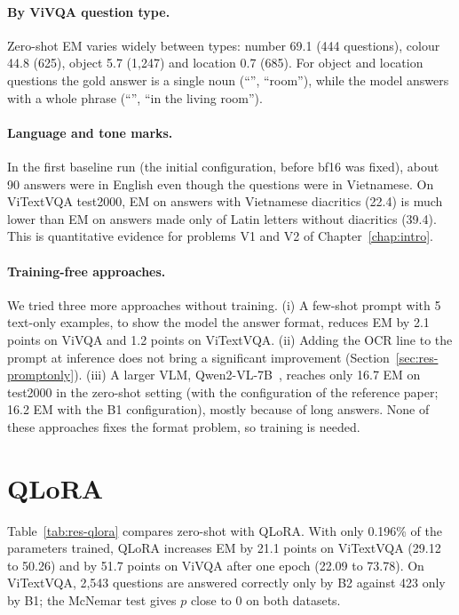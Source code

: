 \paragraph{By ViVQA question type.} Zero-shot EM varies widely between types: number 69.1
(444 questions), colour 44.8 (625), object 5.7 (1,247) and location 0.7 (685). For object
and location questions the gold answer is a single noun (``'', ``room''), while
the model answers with a whole phrase (``'', ``in the living
room'').

\paragraph{Language and tone marks.} In the first baseline run (the initial configuration,
before bf16 was fixed), about 90 answers were in English even though the questions were in
Vietnamese. On ViTextVQA test2000, EM on answers with Vietnamese diacritics (22.4) is much
lower than EM on answers made only of Latin letters without diacritics (39.4). This is
quantitative evidence for problems V1 and V2 of Chapter~\ref{chap:intro}.

\paragraph{Training-free approaches.} We tried three more approaches without
training. (i) A few-shot prompt with 5 text-only examples, to show the model the answer
format, reduces EM by 2.1 points on ViVQA and 1.2 points on ViTextVQA. (ii) Adding the OCR
line to the prompt at inference does not bring a significant improvement
(Section~\ref{sec:res-promptonly}). (iii) A larger VLM, Qwen2-VL-7B~\cite{wang2024qwen2vl},
reaches only 16.7 EM on test2000 in the zero-shot setting (with the configuration of the reference paper; 16.2 EM with the B1 configuration), mostly because of long answers.
None of these approaches fixes the format problem, so training is needed.

\section{QLoRA}
\label{sec:res-qlora}

Table~\ref{tab:res-qlora} compares zero-shot with QLoRA. With only 0.196\% of the
parameters trained, QLoRA increases EM by 21.1 points on ViTextVQA (29.12 to 50.26) and by
51.7 points on ViVQA after one epoch (22.09 to 73.78). On ViTextVQA, 2,543 questions are
answered correctly only by B2 against 423 only by B1; the McNemar test gives $p$ close to
0 on both datasets.

